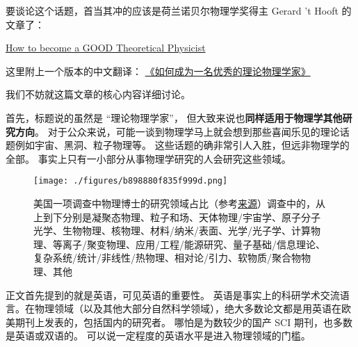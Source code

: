 
要谈论这个话题，首当其冲的应该是荷兰诺贝尔物理学奖得主 Gerard 't Hooft 的文章了：

\href{https://webspace.science.uu.nl/~hooft101/theorist.html}{How to become a GOOD Theoretical Physicist}

这里附上一个版本的中文翻译： \href{https://xialab.pku.edu.cn/kytdyw1/zdylm.m.jsp?wbtreeid=1011&tstreeid=11956&_t_uid=2945&language=en&homepageuuid=BF649325C5584FC683CE0B601D21AC65&templateuuid=4CC182410BA14FF8B55ED726FB2087FB&producttype=0&_tmode_=99&tsitesapptype=zdylm}{《如何成为一名优秀的理论物理学家》}

我们不妨就这篇文章的核心内容详细讨论。

首先，标题说的虽然是 “理论物理学家”， 但大致来说也\textbf{同样适用于物理学其他研究方向}。 对于公众来说，可能一谈到物理学马上就会想到那些喜闻乐见的理论话题例如宇宙、黑洞、粒子物理等。 这些话题的确非常引人入胜，但远非物理学的全部。 事实上只有一小部分从事物理学研究的人会研究这些领域。

\begin{figure}[ht]
\centering
\texttt{[image: ./figures/b898880f835f999d.png]}
\caption{美国一项调查中物理博士的研究领域占比（参考\href{https://ww2.aip.org/statistics/trends-in-physics-phds}{来源}）调查中的，从上到下分别是凝聚态物理、粒子和场、天体物理/宇宙学、原子分子光学、生物物理、核物理、材料/纳米/表面、光学/光子学、计算物理、等离子/聚变物理、应用/工程/能源研究、量子基础/信息理论、复杂系统/统计/非线性/热物理、相对论/引力、软物质/聚合物物理、其他} \label{fig_SdyPhy_1}
\end{figure}

正文首先提到的就是英语，可见英语的重要性。 英语是事实上的科研学术交流语言。在物理领域（以及其他大部分自然科学领域），绝大多数论文都是用英语在欧美期刊上发表的，包括国内的研究者。 哪怕是为数较少的国产 SCI 期刊，也多数是英语或双语的。 可以说一定程度的英语水平是进入物理领域的门槛。


